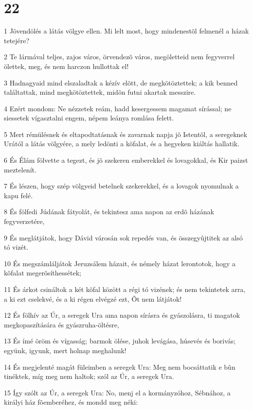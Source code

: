 \chapter{22}

\par 1 Jövendölés a látás völgye ellen. Mi lelt most, hogy mindenestõl felmenél a házak tetejére?
\par 2 Te lármával teljes, zajos város, örvendezõ város, megöletteid nem fegyverrel ölettek, meg, és nem harczon hullottak el!
\par 3 Hadnagyaid mind elszaladtak a kézív elõtt, de megkötöztettek; a kik benned találtattak, mind megkötöztettek, midõn futni akartak messzire.
\par 4 Ezért mondom: Ne nézzetek reám, hadd kesergessem magamat sírással; ne siessetek vígasztalni engem, népem leánya romlása felett.
\par 5 Mert rémülésnek és eltapodtatásnak és zavarnak napja jõ Istentõl, a seregeknek Urától a látás völgyére, a mely ledönti a kõfalat, és a hegyeken kiáltás hallatik.
\par 6 És Élám fölvette a tegezt, és jõ szekeren emberekkel és lovagokkal, és Kir paizst meztelenít.
\par 7 És lészen, hogy szép völgyeid betelnek szekerekkel, és a lovagok nyomulnak a kapu felé.
\par 8 És fölfedi Júdának fátyolát, és tekintesz ama napon az erdõ házának fegyverzetére,
\par 9 És meglátjátok, hogy Dávid városán sok repedés van, és összegyûjtitek az alsó tó vizét.
\par 10 És megszámláljátok Jeruzsálem házait, és némely házat lerontotok, hogy a kõfalat megerõsíthessétek;
\par 11 És árkot csináltok a két kõfal között a régi tó vizének; és nem tekintetek arra, a ki ezt cselekvé, és a ki régen elvégzé ezt, Õt nem látjátok!
\par 12 És fölhív az Úr, a seregek Ura ama napon sírásra és gyászolásra, ti magatok megkopaszítására és gyászruha-öltésre,
\par 13 És ímé öröm és vígasság; barmok ölése, juhok levágása, húsevés és borivás; együnk, igyunk, mert holnap meghalunk!
\par 14 És megjelenté magát füleimben a seregek Ura: Meg nem bocsáttatik e bûn tinéktek, míg meg nem haltok; szól az Úr, a seregek Ura.
\par 15 Így szólt az Úr, a seregek Ura: No, menj el a kormányzóhoz, Sébnához, a királyi ház fõemberéhez, és mondd meg néki:
